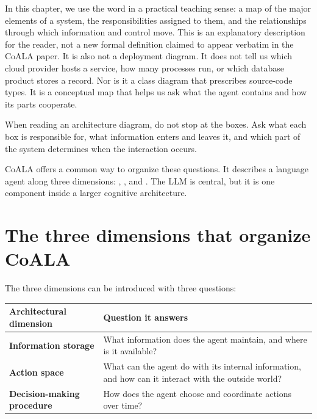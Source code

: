 In this chapter, we use the word  in a practical teaching sense: a map of the major elements of a system, the responsibilities assigned to them, and the relationships through which information and control move. This is an explanatory description for the reader, not a new formal definition claimed to appear verbatim in the CoALA paper. It is also not a deployment diagram. It does not tell us which cloud provider hosts a service, how many processes run, or which database product stores a record. Nor is it a class diagram that prescribes source-code types. It is a conceptual map that helps us ask what the agent contains and how its parts cooperate.

\begin{tipbox}
When reading an architecture diagram, do not stop at the boxes. Ask what each box is responsible for, what information enters and leaves it, and which part of the system determines when the interaction occurs.
\end{tipbox}

CoALA offers a common way to organize these questions. It describes a language agent along three dimensions: , , and . The LLM is central, but it is one component inside a larger cognitive architecture.

\section{The three dimensions that organize CoALA}

The three dimensions can be introduced with three questions:

\begin{center}
\begin{tabularx}{\textwidth}{>{\bfseries}p{} X}
\toprule
Architectural dimension & Question it answers \\
\midrule
Information storage & What information does the agent maintain, and where is it available? \\
Action space & What can the agent do with its internal information, and how can it interact with the outside world? \\
Decision-making procedure & How does the agent choose and coordinate actions over time? \\
\bottomrule
\end{tabularx}
\end{center}

